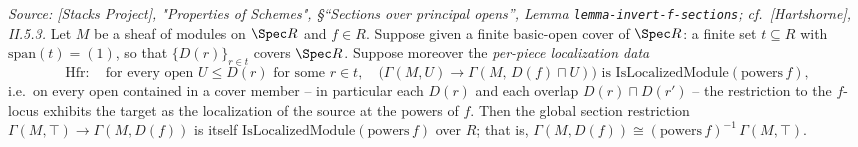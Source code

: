\begin{lemma}
  \label{lem:section_localization_descent_of_cover}
  \textit{Source: [Stacks Project], "Properties of Schemes", \S ``Sections over principal opens'',
  Lemma \texttt{lemma-invert-f-sections}; cf.\ [Hartshorne], II.5.3.}
  Let \(M\) be a sheaf of modules on \(\Spec R\) and \(f \in R\). Suppose given a finite basic-open
  cover of \(\Spec R\): a finite set \(t \subseteq R\) with \(\mathrm{span}(t) = (1)\), so that
  \(\{D(r)\}_{r \in t}\) covers \(\Spec R\). Suppose moreover the \emph{per-piece localization data}
  \[
    \mathrm{Hfr} : \quad \text{for every open } U \le D(r) \text{ for some } r \in t, \quad
    \bigl(\Gamma(M, U) \longrightarrow \Gamma(M,\, D(f) \sqcap U)\bigr)
    \text{ is } \mathrm{IsLocalizedModule}(\mathrm{powers}\,f),
  \]
  i.e.\ on every open contained in a cover member -- in particular each \(D(r)\) and each overlap
  \(D(r) \sqcap D(r')\) -- the restriction to the \(f\)-locus exhibits the target as the localization
  of the source at the powers of \(f\). Then the global section restriction
  \(\Gamma(M, \top) \to \Gamma(M, D(f))\) is itself \(\mathrm{IsLocalizedModule}(\mathrm{powers}\,f)\)
  over \(R\); that is, \(\Gamma(M, D(f)) \cong (\mathrm{powers}\,f)^{-1}\,\Gamma(M, \top)\).
\end{lemma}
